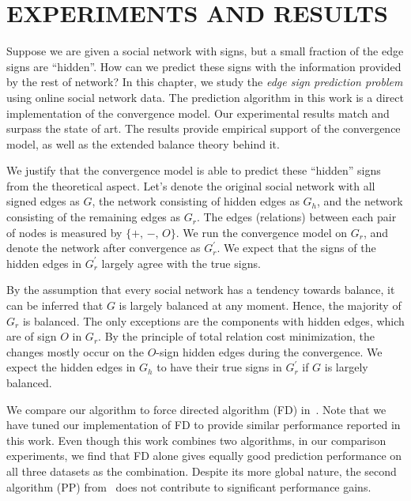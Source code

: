  





\chapter{EXPERIMENTS AND RESULTS} \label{sec:results}
Suppose we are given a social network with signs, but a
small fraction of the edge signs are ``hidden''. How can we predict
these signs with the information provided by the rest of network? In this chapter, we study the {\it edge sign prediction
  problem} using online social network data. The prediction algorithm in this work is a direct implementation of the convergence model. Our experimental results match and surpass the state of art. The results provide empirical support of the convergence model, as well as the extended balance theory behind it.

We justify that the convergence model is able to predict these ``hidden'' signs from the theoretical aspect. Let's
denote the original social network with all signed edges as $G$, the
network consisting of hidden edges as $G_{h}$, and the network
consisting of the remaining edges as $G_{r}$. The edges (relations)
between each pair of nodes is measured by $\{+,\,-,\,O\}$. We run the
convergence model on $G_{r}$, and denote the network after convergence
as $G_{r}^{'}$. We expect that the signs of the hidden edges in
$G_{r}^{'}$ largely agree with the true signs.

By the assumption that every social network has a tendency towards
balance, it can be inferred that $G$ is largely balanced at any
moment. Hence, the majority of $G_{r}$ is balanced. The only
exceptions are the components with hidden edges, which are of sign $O$
in $G_{r}$. By the principle of total relation cost minimization, the
changes mostly occur on the $O$-sign hidden edges during the
convergence. We expect the hidden edges in $G_h$ to have their
true signs in $G_{r}^{'}$ if $G$ is largely balanced.

We compare our algorithm to force directed algorithm (FD)
in~\cite{golbeck:distrust2011}. Note that we have tuned our
implementation of FD to provide similar performance reported in this
work. Even though this work combines two algorithms, in our comparison
experiments, we find that FD alone gives equally good prediction
performance on all three datasets as the combination. Despite its more
global nature, the second algorithm (PP)
from~\cite{golbeck:distrust2011} does not contribute to significant performance gains. 
